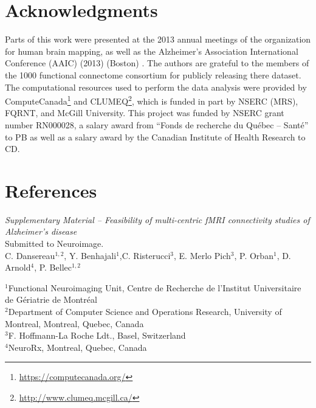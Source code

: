 \documentclass[authoryear]{elsarticle}
\begin{document}
\section{Acknowledgments}
Parts of this work were presented at the 2013 annual meetings of the organization for human brain mapping, as well as the  Alzheimer's Association International Conference (AAIC) (2013) (Boston) \citep{Dansereau2013b}. The authors are grateful to the members of the 1000 functional connectome consortium for publicly releasing there dataset. The computational resources used to perform the data analysis were provided by ComputeCanada\footnote{\url{https://computecanada.org/}} and CLUMEQ\footnote{\url{http://www.clumeq.mcgill.ca/}}, which is funded in part by NSERC (MRS), FQRNT, and McGill University. This project was funded by NSERC grant number RN000028, a salary award from ``Fonds de recherche du Qu\'ebec -- Sant\'e'' to PB as well as a salary award by the Canadian Institute of Health Research to CD.

\section*{References}





\pagebreak



\clearpage
\appendix


\clearpage
\pagebreak
\renewcommand{\thefigure}{S\arabic{figure}}
\renewcommand{\thetable}{S\arabic{table}}
\setcounter{figure}{0}
\begin{center}
\emph{Supplementary Material {--} Feasibility of multi-centric fMRI connectivity studies of Alzheimer's disease}\\

\vspace{\baselineskip}Submitted to Neuroimage.\\

\vspace{\baselineskip}C. Dansereau$^{1,2}$,  Y. Benhajali$^{1}$,C. Risterucci$^{3}$, E. Merlo Pich$^{3}$, P. Orban$^{1}$, D. Arnold$^{4}$, P. Bellec$^{1,2}$\\

\end{center}
$^1$Functional Neuroimaging Unit, Centre de Recherche de l'Institut Universitaire de G\'eriatrie de Montr\'eal\\
$^2$Department of Computer Science and Operations Research, University of Montreal, Montreal, Quebec, Canada\\
$^3$F. Hoffmann-La Roche Ldt., Basel, Switzerland\\
$^4$NeuroRx, Montreal, Quebec, Canada\\
\end{document}
